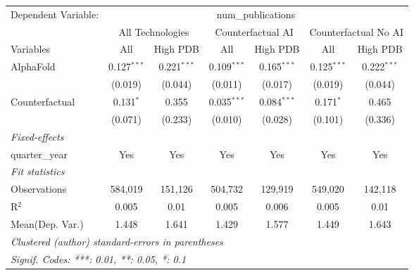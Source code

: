 \begingroup
\centering
\begin{tabular}{lcccccc}
   \tabularnewline \midrule \midrule
   Dependent Variable: & \multicolumn{6}{c}{num\_publications}\\
 & \multicolumn{2}{c}{All Technologies} & \multicolumn{2}{c}{Counterfactual AI} & \multicolumn{2}{c}{Counterfactual No AI} \\
\cmidrule(lr){1-1}\cmidrule(lr){2-3} \cmidrule(lr){4-5} \cmidrule(lr){6-7}
Variables & \multicolumn{1}{c}{All} & \multicolumn{1}{c}{High PDB} & \multicolumn{1}{c}{All} & \multicolumn{1}{c}{High PDB} & \multicolumn{1}{c}{All} & \multicolumn{1}{c}{High PDB} \\
\cmidrule(lr){1-1}\cmidrule(lr){2-2} \cmidrule(lr){3-3} \cmidrule(lr){4-4} \cmidrule(lr){5-5} \cmidrule(lr){6-6} \cmidrule(lr){7-7}
   AlphaFold      & 0.127$^{***}$ & 0.221$^{***}$ & 0.109$^{***}$ & 0.165$^{***}$ & 0.125$^{***}$ & 0.222$^{***}$\\   
                  & (0.019)       & (0.044)       & (0.011)       & (0.017)       & (0.019)       & (0.044)\\   
   Counterfactual & 0.131$^{*}$   & 0.355         & 0.035$^{***}$ & 0.084$^{***}$ & 0.171$^{*}$   & 0.465\\   
                  & (0.071)       & (0.233)       & (0.010)       & (0.028)       & (0.101)       & (0.336)\\   
   \midrule
   \emph{Fixed-effects}\\
   quarter\_year  & Yes           & Yes           & Yes           & Yes           & Yes           & Yes\\  
   \midrule
   \emph{Fit statistics}\\
   Observations   & 584,019       & 151,126       & 504,732       & 129,919       & 549,020       & 142,118\\  
   R$^2$          & 0.005         & 0.01          & 0.005         & 0.006         & 0.005         & 0.01\\  
Mean(Dep. Var.) & 1.448 & 1.641 & 1.429 & 1.577 & 1.449 & 1.643 \\
   \midrule \midrule
   \multicolumn{7}{l}{\emph{Clustered (author) standard-errors in parentheses}}\\
   \multicolumn{7}{l}{\emph{Signif. Codes: ***: 0.01, **: 0.05, *: 0.1}}\\
\end{tabular}
\par\endgroup
